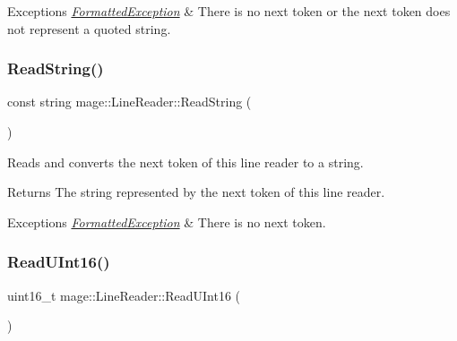 \begin{DoxyExceptions}{Exceptions}
{\em \hyperlink{structmage_1_1_formatted_exception}{Formatted\+Exception}} & There is no next token or the next token does not represent a quoted string. \\
\hline
\end{DoxyExceptions}
\hypertarget{classmage_1_1_line_reader_a58a27b637574ce56ea17a575aa540675}{}\label{classmage_1_1_line_reader_a58a27b637574ce56ea17a575aa540675} 
\subsubsection{\texorpdfstring{Read\+String()}{ReadString()}}
{\footnotesize\ttfamily const string mage\+::\+Line\+Reader\+::\+Read\+String (\begin{DoxyParamCaption}{ }\end{DoxyParamCaption})\hspace{0.3cm}{\ttfamily [protected]}}

Reads and converts the next token of this line reader to a string.

\begin{DoxyReturn}{Returns}
The string represented by the next token of this line reader. 
\end{DoxyReturn}

\begin{DoxyExceptions}{Exceptions}
{\em \hyperlink{structmage_1_1_formatted_exception}{Formatted\+Exception}} & There is no next token. \\
\hline
\end{DoxyExceptions}
\hypertarget{classmage_1_1_line_reader_a89f8d84257eae17db8c1e67d17f839f9}{}\label{classmage_1_1_line_reader_a89f8d84257eae17db8c1e67d17f839f9} 
\subsubsection{\texorpdfstring{Read\+U\+Int16()}{ReadUInt16()}}
{\footnotesize\ttfamily uint16\+\_\+t mage\+::\+Line\+Reader\+::\+Read\+U\+Int16 (\begin{DoxyParamCaption}{ }\end{DoxyParamCaption})\hspace{0.3cm}{\ttfamily [protected]}}

